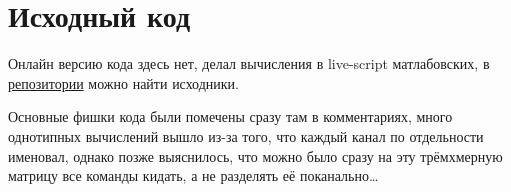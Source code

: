 \chapter{Исходный код}
\label{ch:chap0}



\lstset{style=mystyle}

Онлайн версию кода здесь нет, делал вычисления в live-script матлабовских, в \href{https://github.com/GreedlyCore/fourier_series_course}{репозитории} можно найти исходники. 

Основные фишки кода были помечены сразу там в комментариях, много однотипных вычислений вышло из-за того, что каждый канал по отдельности именовал, однако позже выяснилось, что можно было сразу на эту трёмхмерную матрицу все команды кидать, а не разделять её поканально\dots 

\endinput